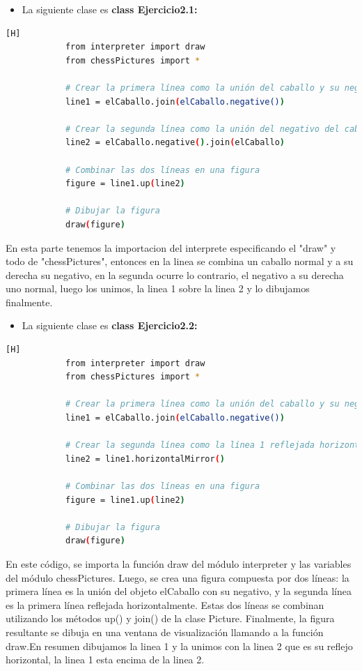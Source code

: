 \documentclass{article}
\begin{document}
\clearpage
	\begin{itemize}	
		\item La siguiente clase es \textbf{class Ejercicio2.1:} 
	\end{itemize}
 
	\begin{lstlisting}[language=bash,caption={\textbf{PRIMER EJERCICIO}}][H]
            from interpreter import draw
            from chessPictures import *
            
            # Crear la primera línea como la unión del caballo y su negativo
            line1 = elCaballo.join(elCaballo.negative())
            
            # Crear la segunda línea como la unión del negativo del caballo y el caballo original
            line2 = elCaballo.negative().join(elCaballo)
            
            # Combinar las dos líneas en una figura
            figure = line1.up(line2)
            
            # Dibujar la figura
            draw(figure)
	\end{lstlisting}
En esta parte tenemos la importacion del interprete especificando el "draw" y todo de "chessPictures", entonces en la linea se combina un caballo normal y a su derecha su negativo, en la segunda ocurre lo contrario, el negativo a su derecha uno normal, luego los unimos, la linea 1 sobre la linea 2 y lo dibujamos finalmente.

\begin{itemize}	
		\item La siguiente clase es \textbf{class Ejercicio2.2:} 
	\end{itemize}
 
	\begin{lstlisting}[language=bash,caption={\textbf{SEGUNDO EJERCICIO}}][H]
            from interpreter import draw
            from chessPictures import *
            
            # Crear la primera línea como la unión del caballo y su negativo
            line1 = elCaballo.join(elCaballo.negative())
            
            # Crear la segunda línea como la línea 1 reflejada horizontalmente
            line2 = line1.horizontalMirror()
            
            # Combinar las dos líneas en una figura
            figure = line1.up(line2)
            
            # Dibujar la figura
            draw(figure)
	\end{lstlisting}
En este código, se importa la función draw del módulo interpreter y las variables del módulo chessPictures. Luego, se crea una figura compuesta por dos líneas: la primera línea es la unión del objeto elCaballo con su negativo, y la segunda línea es la primera línea reflejada horizontalmente. Estas dos líneas se combinan utilizando los métodos up() y join() de la clase Picture. Finalmente, la figura resultante se dibuja en una ventana de visualización llamando a la función draw.En resumen dibujamos la linea 1 y la unimos con la linea 2 que es su reflejo horizontal, la linea 1 esta encima de la linea 2.
\end{document}

